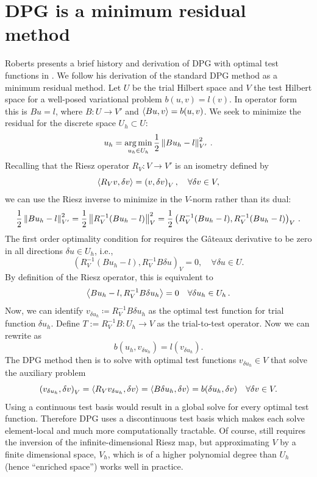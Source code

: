 \documentclass[Proposal.tex]{subfiles}
\begin{document}
\section{DPG is a minimum residual method}
Roberts \etal presents a brief history and derivation of DPG with optimal test functions in
\cite{DPGStokes}. We follow his derivation of the standard DPG method as a
minimum residual method. Let $U$ be the trial Hilbert space and $V$ the test
Hilbert space for a well-posed variational problem $b(u,v)=l(v)$. In operator
form this is $Bu=l$, where $B:U\rightarrow V'$ and $\left\langle Bu,v \right\rangle=b(u,v)$. We seek to minimize the
residual for the discrete space $U_h\subset U$:
\begin{equation}
u_h=\operatorname*{arg\,min}_{u_h\in U_h}\frac{1}{2}\left\| Bu_h-l \right\|^2_{V'}\,.
\label{minresidual}
\end{equation}
Recalling that the Riesz operator $R_V:V\rightarrow V'$ is an isometry defined
by
\[
\left\langle R_Vv,\delta v \right\rangle=\left( v,\delta v \right)_V,\quad\forall\delta v\in V,
\]
we can use the Riesz inverse to minimize in the $V$-norm rather than its dual:
\begin{equation}
\frac{1}{2}\left\| Bu_h-l \right\|^2_{V'}=\frac{1}{2}\left\| R_V^{-1}(Bu_h-l) \right\|^2_V
=\frac{1}{2}\left( R_V^{-1}(Bu_h-l),R_V^{-1}(Bu_h-l) \right)_V\,.
\label{eq:rieszapplied}
\end{equation}
The first order optimality condition for  requires
the G\^ateaux derivative to be zero in all directions $\delta u \in
U_h$, i.e.,
\[
\left(R_V^{-1}(Bu_h-l),R_V^{-1}B\delta u\right)_V = 0, \quad \forall \delta u \in U.
\]
By definition of the Riesz operator, this is equivalent to
\begin{equation}
\left\langle Bu_h-l,R_V^{-1}B\delta u_h \right\rangle=0\quad\forall\delta u_h\in U_h\,.
\label{eq:DPGbilinearform}
\end{equation}
Now, we can identify $v_{\delta u_h}\coloneqq R_V^{-1}B\delta u_h$ as the
optimal test function for trial function $\delta u_h$. Define $T:=R_V^{-1}B:U_h\rightarrow V$ as the trial-to-test operator. Now we can rewrite
 as
\begin{equation}
b(u_h,v_{\delta u_h})=l(v_{\delta u_h}).
\label{eq:DPGmethod}
\end{equation}
The DPG method then is to solve  with optimal test functions
$v_{\delta u_h}\in V$ that solve the auxiliary problem
\begin{equation}
\left( v_{\delta u_h},\delta v \right)_V=\left\langle R_Vv_{\delta u_h},\delta v \right\rangle
=\left\langle B\delta u_h,\delta v \right\rangle=b(\delta u_h,\delta v)\quad\forall\delta v\in V.
\label{eq:optimaltestproblem}
\end{equation}
Using a continuous test basis would result in a global solve for every optimal
test function. Therefore DPG uses a discontinuous test basis which makes each
solve element-local and much more computationally tractable. Of course,
 still requires the inversion of the
infinite-dimensional Riesz map, but approximating $V$ by a finite
dimensional space, $V_h$, which is of a higher polynomial degree than $U_h$ (hence
``enriched space'') works well in practice.
\end{document}
